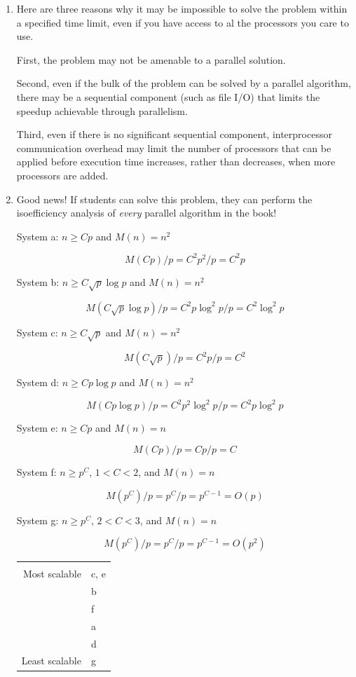 \begin{enumerate}
      Because the proportion of inherently sequential operations drops
      when fixing $s$ and increasing $p$, the scaled speedup predicted by
      Gustafson-Barsis' Law increases without bound.

\item Here are three reasons why it may be impossible to
      solve the problem within
      a specified time limit, even if you have access to al the processors
      you care to use.

      First, the problem may not be amenable to a parallel
      solution.

      Second, even if the bulk of the problem can be solved by a parallel
      algorithm, there may be a sequential component (such as file I/O) that
      limits the speedup achievable through parallelism.

      Third, even if there is no significant sequential component,
      interprocessor communication overhead may limit the number of
      processors that can be applied before execution time increases,
      rather than decreases, when more processors are added.

\item Good news! If students can solve this problem,
      they can perform the isoefficiency
      analysis of {\it every} parallel algorithm in the book!

      System a: $n \ge Cp$ and $M(n) = n^2$

      $$M(Cp)/p = C^2p^2/p = C^2p$$

      System b: $n \ge C\sqrt{p}\log p$ and $M(n) = n^2$

      $$M(C\sqrt{p}\log p)/p = C^2p\log^2p/p = C^2\log^2p$$

      System c: $n \ge C\sqrt{p}$ and $M(n) = n^2$

      $$M(C\sqrt{p})/p = C^2p/p = C^2$$

      System d: $n \ge Cp\log p$ and $M(n) = n^2$

      $$M(Cp\log p)/p = C^2p^2\log^2 p/p = C^2 p\log^2 p$$

      System e: $n \ge Cp$ and $M(n) = n$

      $$M(Cp)/p = Cp / p = C$$

      System f: $n \ge p^C$, $1 < C < 2$, and $M(n) = n$

      $$M(p^C)/p = p^C/p = p^{C-1} = O(p)$$

      System g: $n \ge p^C$, $2 < C < 3$, and $M(n) = n$

      $$M(p^C)/p = p^C/p = p^{C-1} = O(p^2)$$

      \begin{tabular}{rl}
      \hline
      {\it }         & {\it } \\
      Most scalable & c, e \\
       & b \\
       & f \\
       & a \\
       & d \\
      Least scalable & g \\
      \end{tabular}

\end{enumerate}

